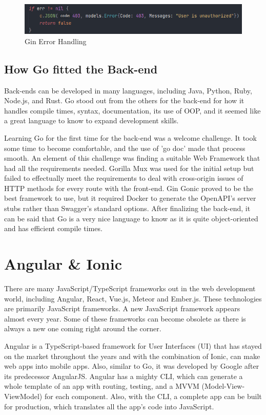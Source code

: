 \begin{figure}[H]
    \caption{Gin Error Handling}
    \label{image:ginError}
    \centering
    \includegraphics[width=1.0\textwidth]{images/misc/cookie-error.png}
\end{figure}

\subsection{How Go fitted the Back-end}
Back-ends can be developed in many languages, including Java, Python, Ruby, Node.js, and Rust. Go stood out from the others for the back-end for how it handles compile times, syntax, documentation, its use of OOP, and it seemed like a great language to know to expand development skills. 

Learning Go for the first time for the back-end was a welcome challenge. It took some time to become comfortable, and the use of 'go doc' made that process smooth. An element of this challenge was finding a suitable Web Framework that had all the requirements needed. Gorilla Mux was used for the initial setup but failed to effectually meet the requirements to deal with cross-origin issues of HTTP methods for every route with the front-end.
Gin Gonic proved to be the best framework to use, but it required Docker to generate the OpenAPI's server stubs rather than Swagger's standard options. After finalizing the back-end, it can be said that Go is a very nice language to know as it is quite object-oriented and has efficient compile times. 
 
\section{Angular \& Ionic}
There are many JavaScript/TypeScript frameworks out in the web development world, including Angular, React, Vue.js, Meteor and Ember.js. These technologies are primarily JavaScript frameworks. A new JavaScript framework appears almost every year. Some of these frameworks can become obsolete as there is always a new one coming right around the corner.

Angular is a TypeScript-based framework for User Interfaces (UI) that has stayed on the market throughout the years \cite{ref14} and with the combination of Ionic, can make web apps into mobile apps. Also, similar to Go, it was developed by Google after its predecessor AngularJS. Angular has a mighty CLI, which can generate a whole template of an app with routing, testing, and a MVVM (Model-View-ViewModel) for each component. Also, with the CLI, a complete app can be built for production, which translates all the app's code into JavaScript.

